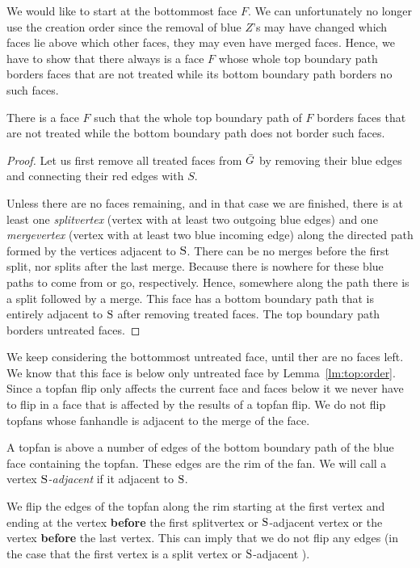   We would like to start at the bottommost face $F$. We can unfortunately no longer use the creation order since the removal of blue $Z$'s may have changed which faces lie above which other faces, they may even have merged faces.
  Hence, we have to show that there always is a face $F$ whose whole top boundary path borders faces that are not treated while its bottom boundary path borders no such faces.

  \begin{lemma}
    \label{lm:top:order}
    There is a face $F$ such that the whole top boundary path of $F$ borders faces that are not treated while the bottom boundary path does not border such faces.
  \end{lemma}
  \begin{proof}
    Let us first remove all treated faces from $\bar{G}$ by removing their blue edges and connecting their red edges with $S$.

    Unless there are no faces remaining, and in that case we are finished, there is at least one \emph{splitvertex} (vertex with at least two outgoing blue edges) and one \emph{mergevertex} (vertex with at least two blue incoming edge) along the directed path formed by the vertices adjacent to $\mathrm{S}$.
    There can be no merges before the first split, nor splits after the last merge. Because there is nowhere for these blue paths to come from or go, respectively.
    Hence, somewhere along the path there is a split followed by a merge.
    This face has a bottom boundary path that is entirely adjacent to $\mathrm{S}$ after removing treated faces.
    The top boundary path borders untreated faces.
  \end{proof}

  We keep considering the bottommost untreated face, until ther are no faces left. We know that this face is below only untreated face by Lemma~\ref{lm:top:order}. Since a topfan flip only affects the current face and faces below it we never have to flip in a face that is affected by the results of a topfan flip.
  We do not flip topfans whose fanhandle is adjacent to the merge of the face.

  A topfan is above a number of edges of the bottom boundary path of the blue face containing the topfan. These edges are the rim of the fan. We will call a vertex \emph{$\mathrm{S}$-adjacent} if it adjacent to $\mathrm{S}$.

  We flip the edges of the topfan along the rim starting at the first vertex and ending at the vertex \textbf{before} the first splitvertex or $\mathrm{S}$-adjacent vertex or the vertex \textbf{before} the last vertex. This can imply that we do not flip any edges (in the case that the first vertex is a split vertex or $\mathrm{S}$-adjacent ).

